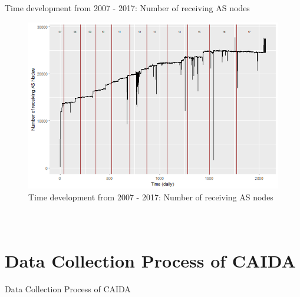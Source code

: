 \documentclass[conference]{IEEEtran}
\begin{document}
Time development from 2007 - 2017: Number of receiving AS nodes

\begin{figure}[htbp]
\centerline{\includegraphics[scale=0.4]{Graphics/ASToAll.png}}
\caption{Time development from 2007 - 2017: Number of receiving AS nodes}
\label{fig}
\end{figure}




\section{\\Data Collection Process of CAIDA}
Data Collection Process of CAIDA
\end{document}
